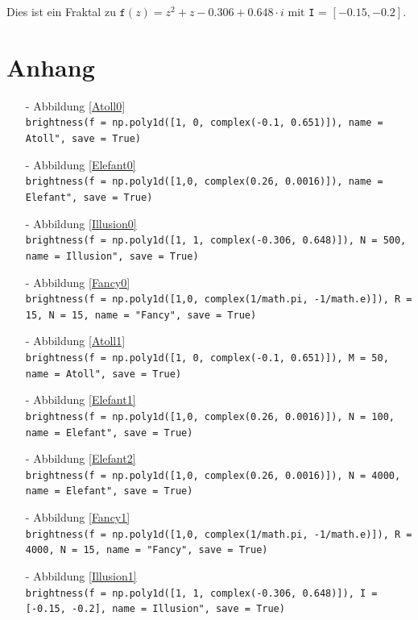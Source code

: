 \documentclass[12pt]{scrartcl}
\begin{document}
Dies ist ein Fraktal zu $\texttt{f}(z) = z^2 + z - 0.306 + 0.648 \cdot i$ mit \texttt{I} = $[-0.15 , -0.2]$.

\newpage

\section{Anhang}\label{Anhang}
\begin{itemize}
\item[-] Abbildung \ref{Atoll0}\\
\texttt{brightness(f = np.poly1d([1, 0, complex(-0.1, 0.651)]), name = \dq Atoll", save = True)}
\item[-] Abbildung \ref{Elefant0}\\
\texttt{brightness(f = np.poly1d([1,0, complex(0.26, 0.0016)]), name = \dq Elefant", save = True)}
\item[-] Abbildung \ref{Illusion0}\\
\texttt{brightness(f = np.poly1d([1, 1, complex(-0.306, 0.648)]), N = 500, name = \dq Illusion", save = True)}
\item[-] Abbildung \ref{Fancy0}\\
\texttt{brightness(f = np.poly1d([1,0, complex(1/math.pi, -1/math.e)]), R = 15, N = 15, name = "Fancy", save = True)}
\item[-] Abbildung \ref{Atoll1}\\
\texttt{brightness(f = np.poly1d([1, 0, complex(-0.1, 0.651)]), M = 50, name = \dq Atoll", save = True)}
\item[-] Abbildung \ref{Elefant1}\\
\texttt{brightness(f = np.poly1d([1,0, complex(0.26, 0.0016)]), N = 100, name = \dq Elefant", save = True)}
\item[-] Abbildung \ref{Elefant2}\\
\texttt{brightness(f = np.poly1d([1,0, complex(0.26, 0.0016)]), N = 4000, name = \dq Elefant", save = True)}
\item[-] Abbildung \ref{Fancy1}\\
\texttt{brightness(f = np.poly1d([1,0, complex(1/math.pi, -1/math.e)]), R = 4000, N = 15, name = "Fancy", save = True)}
\item[-] Abbildung \ref{Illusion1}\\
\texttt{brightness(f = np.poly1d([1, 1, complex(-0.306, 0.648)]), I = [-0.15, -0.2], name = \dq Illusion", save = True)}
\end{itemize}
\end{document}
